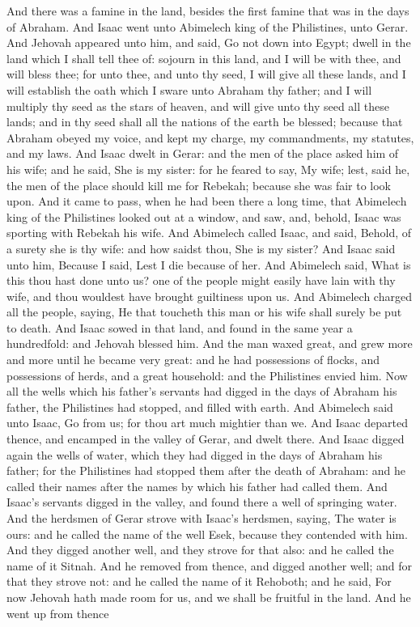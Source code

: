 And there was a famine in the land, besides the first famine that was in the days of Abraham. And Isaac went unto Abimelech king of the Philistines, unto Gerar. And Jehovah appeared unto him, and said, Go not down into Egypt; dwell in the land which I shall tell thee of: sojourn in this land, and I will be with thee, and will bless thee; for unto thee, and unto thy seed, I will give all these lands, and I will establish the oath which I sware unto Abraham thy father; and I will multiply thy seed as the stars of heaven, and will give unto thy seed all these lands; and in thy seed shall all the nations of the earth be blessed; because that Abraham obeyed my voice, and kept my charge, my commandments, my statutes, and my laws. And Isaac dwelt in Gerar: and the men of the place asked him of his wife; and he said, She is my sister: for he feared to say, My wife; lest, said he, the men of the place should kill me for Rebekah; because she was fair to look upon. And it came to pass, when he had been there a long time, that Abimelech king of the Philistines looked out at a window, and saw, and, behold, Isaac was sporting with Rebekah his wife. And Abimelech called Isaac, and said, Behold, of a surety she is thy wife: and how saidst thou, She is my sister? And Isaac said unto him, Because I said, Lest I die because of her. And Abimelech said, What is this thou hast done unto us? one of the people might easily have lain with thy wife, and thou wouldest have brought guiltiness upon us. And Abimelech charged all the people, saying, He that toucheth this man or his wife shall surely be put to death.  And Isaac sowed in that land, and found in the same year a hundredfold: and Jehovah blessed him. And the man waxed great, and grew more and more until he became very great: and he had possessions of flocks, and possessions of herds, and a great household: and the Philistines envied him. Now all the wells which his father’s servants had digged in the days of Abraham his father, the Philistines had stopped, and filled with earth. And Abimelech said unto Isaac, Go from us; for thou art much mightier than we. And Isaac departed thence, and encamped in the valley of Gerar, and dwelt there.  And Isaac digged again the wells of water, which they had digged in the days of Abraham his father; for the Philistines had stopped them after the death of Abraham: and he called their names after the names by which his father had called them. And Isaac’s servants digged in the valley, and found there a well of springing water. And the herdsmen of Gerar strove with Isaac’s herdsmen, saying, The water is ours: and he called the name of the well Esek, because they contended with him. And they digged another well, and they strove for that also: and he called the name of it Sitnah. And he removed from thence, and digged another well; and for that they strove not: and he called the name of it Rehoboth; and he said, For now Jehovah hath made room for us, and we shall be fruitful in the land.  And he went up from thence 